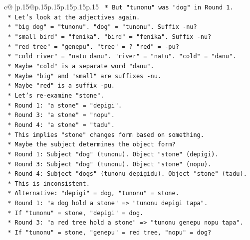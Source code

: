 \documentclass{article}
\begin{document}
{\begin{supertabular}{c@{$\;$}|p{.15\linewidth}@{}p{.15\linewidth}p{.15\linewidth}p{.15\linewidth}p{.15\linewidth}p{.15\linewidth}}
{{{\texttt{        *   But "tunonu" was "dog" in Round 1.} \\
\texttt{        *   Let's look at the adjectives again.} \\
\texttt{        *   "big dog" = "tunonu". "dog" = "tunonu". Suffix {-}nu?} \\
\texttt{        *   "small bird" = "fenika". "bird" = "fenika". Suffix {-}nu?} \\
\texttt{        *   "red tree" = "genepu". "tree" = ? "red" = {-}pu?} \\
\texttt{        *   "cold river" = "natu danu". "river" = "natu". "cold" = "danu".} \\
\texttt{        *   Maybe "cold" is a separate word "danu".} \\
\texttt{        *   Maybe "big" and "small" are suffixes {-}nu.} \\
\texttt{        *   Maybe "red" is a suffix {-}pu.} \\
\texttt{        *   Let's re{-}examine "stone".} \\
\texttt{        *   Round 1: "a stone" = "depigi".} \\
\texttt{        *   Round 3: "a stone" = "nopu".} \\
\texttt{        *   Round 4: "a stone" = "tadu".} \\
\texttt{        *   This implies "stone" changes form based on something.} \\
\texttt{        *   Maybe the subject determines the object form?} \\
\texttt{        *   Round 1: Subject "dog" (tunonu). Object "stone" (depigi).} \\
\texttt{        *   Round 3: Subject "dog" (tunonu). Object "stone" (nopu).} \\
\texttt{        *   Round 4: Subject "dogs" (tunonu depigidu). Object "stone" (tadu).} \\
\texttt{        *   This is inconsistent.} \\
\texttt{        *   Alternative: "depigi" = dog, "tunonu" = stone.} \\
\texttt{        *   Round 1: "a dog hold a stone" => "tunonu depigi tapa".} \\
\texttt{        *   If "tunonu" = stone, "depigi" = dog.} \\
\texttt{        *   Round 3: "a red tree hold a stone" => "tunonu genepu nopu tapa".} \\
\texttt{        *   If "tunonu" = stone, "genepu" = red tree, "nopu" = dog?} \\
}}}
\end{supertabular}}
\end{document}
